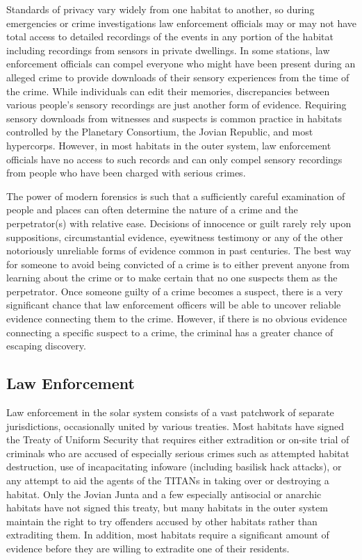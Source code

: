 Standards of privacy vary widely from one habitat 
to another, so during emergencies or crime investigations
law enforcement officials may or may not
have total access to detailed recordings of the events 
in any portion of the habitat including recordings 
from sensors in private dwellings. In some stations, 
law enforcement officials can compel everyone who 
might have been present during an alleged crime to 
provide downloads of their sensory experiences from 
the time of the crime. While individuals can edit their 
memories, discrepancies between various people's 
sensory recordings are just another form of evidence. 
Requiring sensory downloads from witnesses and 
suspects is common practice in habitats controlled 
by the Planetary Consortium, the Jovian Republic, 
and most hypercorps. However, in most habitats in 
the outer system, law enforcement officials have no 
access to such records and can only compel sensory 
recordings from people who have been charged with 
serious crimes.

The power of modern forensics is such that a sufficiently
careful examination of people and places
can often determine the nature of a crime and the 
perpetrator(s) with relative ease. Decisions of innocence
or guilt rarely rely upon suppositions, circumstantial
evidence, eyewitness testimony or any of
the other notoriously unreliable forms of evidence 
common in past centuries. The best way for someone
to avoid being convicted of a crime is to either
prevent anyone from learning about the crime or 
to make certain that no one suspects them as the 
perpetrator. Once someone guilty of a crime becomes 
a suspect, there is a very significant chance that law 
enforcement officers will be able to uncover reliable 
evidence connecting them to the crime. However, if 
there is no obvious evidence connecting a specific 
suspect to a crime, the criminal has a greater chance 
of escaping discovery.

\subsection{Law Enforcement}

Law enforcement in the solar system consists of a 
vast patchwork of separate jurisdictions, occasionally 
united by various treaties. Most habitats have signed 
the Treaty of Uniform Security that requires either extradition
or on-site trial of criminals who are accused
of especially serious crimes such as attempted habitat 
destruction, use of incapacitating infoware (including 
basilisk hack attacks), or any attempt to aid the agents 
of the TITANs in taking over or destroying a habitat. 
Only the Jovian Junta and a few especially antisocial 
or anarchic habitats have not signed this treaty, but 
many habitats in the outer system maintain the right 
to try offenders accused by other habitats rather than 
extraditing them. In addition, most habitats require a 
significant amount of evidence before they are willing 
to extradite one of their residents.

